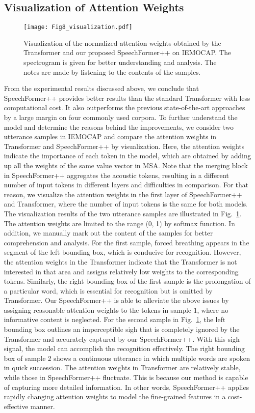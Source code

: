 \documentclass[lettersize,journal]{IEEEtran}
\begin{document}
\subsection{Visualization of Attention Weights}

\begin{figure}[t]
\centering
\texttt{[image: Fig8\_visualization.pdf]}
\caption{Visualization of the normalized attention weights obtained by the Transformer and our proposed SpeechFormer++ on IEMOCAP. The spectrogram is given for better understanding and analysis. The notes are made by listening to the contents of the samples.}
\label{fig_6}
\end{figure}

From the experimental results discussed above, we conclude that SpeechFormer++ provides better results than the standard Transformer with less computational cost. It also outperforms the previous state-of-the-art approaches by a large margin on four commonly used corpora. To further understand the model and determine the reasons behind the improvements, we consider two utterance samples in IEMOCAP and compare the attention weights in Transformer and SpeechFormer++ by visualization. Here, the attention weights indicate the importance of each token in the model, which are obtained by adding up all the weights of the same value vector in MSA. Note that the merging block in SpeechFormer++ aggregates the acoustic tokens, resulting in a different number of input tokens in different layers and difficulties in comparison. For that reason, we visualize the attention weights in the first layer of SpeechFormer++ and Transformer, where the number of input tokens is the same for both models. The visualization results of the two utterance samples are illustrated in Fig.~\ref{fig_6}. The attention weights are limited to the range (0, 1) by softmax function. In addition, we manually mark out the content of the samples for better comprehension and analysis. For the first sample, forced breathing appears in the segment of the left bounding box, which is conducive for recognition. However, the attention weights in the Transformer indicate that the Transformer is not interested in that area and assigns relatively low weights to the corresponding tokens. Similarly, the right bounding box of the first sample is the prolongation of a particular word, which is essential for recognition but is omitted by Transformer. Our SpeechFormer++ is able to alleviate the above issues by assigning reasonable attention weights to the tokens in sample 1, where no informative content is neglected. For the second sample in Fig.~\ref{fig_6}, the left bounding box outlines an imperceptible sigh that is completely ignored by the Transformer and accurately captured by our SpeechFormer++. With this sigh signal, the model can accomplish the recognition effectively. The right bounding box of sample 2 shows a continuous utterance in which multiple words are spoken in quick succession. The attention weights in Transformer are relatively stable, while those in SpeechFormer++ fluctuate. This is because our method is capable of capturing more detailed information. In other words, SpeechFormer++ applies rapidly changing attention weights to model the fine-grained features in a cost-effective manner.
\end{document}
